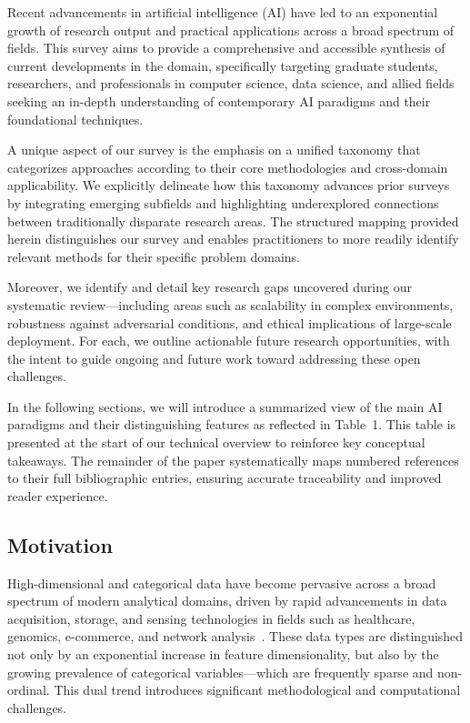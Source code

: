 \documentclass[sigconf]{acmart}
\begin{document}
Recent advancements in artificial intelligence (AI) have led to an exponential growth of research output and practical applications across a broad spectrum of fields. This survey aims to provide a comprehensive and accessible synthesis of current developments in the domain, specifically targeting graduate students, researchers, and professionals in computer science, data science, and allied fields seeking an in-depth understanding of contemporary AI paradigms and their foundational techniques.

A unique aspect of our survey is the emphasis on a unified taxonomy that categorizes approaches according to their core methodologies and cross-domain applicability. We explicitly delineate how this taxonomy advances prior surveys by integrating emerging subfields and highlighting underexplored connections between traditionally disparate research areas. The structured mapping provided herein distinguishes our survey and enables practitioners to more readily identify relevant methods for their specific problem domains.

Moreover, we identify and detail key research gaps uncovered during our systematic review—including areas such as scalability in complex environments, robustness against adversarial conditions, and ethical implications of large-scale deployment. For each, we outline actionable future research opportunities, with the intent to guide ongoing and future work toward addressing these open challenges.

In the following sections, we will introduce a summarized view of the main AI paradigms and their distinguishing features as reflected in Table~1. This table is presented at the start of our technical overview to reinforce key conceptual takeaways. The remainder of the paper systematically maps numbered references to their full bibliographic entries, ensuring accurate traceability and improved reader experience.

\subsection{Motivation}

High-dimensional and categorical data have become pervasive across a broad spectrum of modern analytical domains, driven by rapid advancements in data acquisition, storage, and sensing technologies in fields such as healthcare, genomics, e-commerce, and network analysis~\cite{ref1,ref2,ref5,ref6,ref11,ref12,ref30,ref32,ref36,ref37,ref38,ref39,ref42,ref43,ref46,ref52,ref71,ref72,ref73,ref76,ref90,ref93,ref96,ref110}. These data types are distinguished not only by an exponential increase in feature dimensionality, but also by the growing prevalence of categorical variables—which are frequently sparse and non-ordinal. This dual trend introduces significant methodological and computational challenges.
\end{document}
